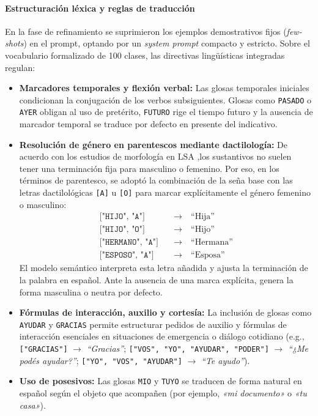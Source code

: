 \paragraph{Estructuración léxica y reglas de traducción}
En la fase de refinamiento se suprimieron los ejemplos demostrativos fijos (\textit{few-shots}) en el prompt, optando por un \textit{system prompt} compacto y estricto. Sobre el vocabulario formalizado de 100 clases, las directivas lingüísticas integradas regulan:
\begin{itemize}
    \item \textbf{Marcadores temporales y flexión verbal:} Las glosas temporales iniciales condicionan la conjugación de los verbos subsiguientes. Glosas como \texttt{PASADO} o \texttt{AYER} obligan al uso de pretérito, \texttt{FUTURO} rige el tiempo futuro y la ausencia de marcador temporal se traduce por defecto en presente del indicativo.
    \item \textbf{Resolución de género en parentescos mediante dactilología:} De acuerdo con los estudios de morfología en LSA \parencite{massone1993numero},los sustantivos no suelen tener una terminación fija para masculino o femenino. Por eso, en los términos de parentesco, se adoptó la combinación de la seña base con las letras dactilológicas \texttt{[A]} u \texttt{[O]} para marcar explícitamente el género femenino o masculino:
    \begin{align*}
        \texttt{["HIJO", "A"]} &\quad\longrightarrow\quad \text{``Hija''} \\
        \texttt{["HIJO", "O"]} &\quad\longrightarrow\quad \text{``Hijo''} \\
        \texttt{["HERMANO", "A"]} &\quad\longrightarrow\quad \text{``Hermana''} \\
        \texttt{["ESPOSO", "A"]} &\quad\longrightarrow\quad \text{``Esposa''}
    \end{align*}
    El modelo semántico interpreta esta letra añadida y ajusta la terminación de la palabra en español. Ante la ausencia de una marca explícita, genera la forma masculina o neutra por defecto.
    \item \textbf{Fórmulas de interacción, auxilio y cortesía:} La inclusión de glosas como \texttt{AYUDAR} y \texttt{GRACIAS} permite estructurar pedidos de auxilio y fórmulas de interacción esenciales en situaciones de emergencia o diálogo cotidiano (e.g., \texttt{["GRACIAS"]} $\longrightarrow$ \textit{``Gracias''}; \texttt{["VOS", "YO", "AYUDAR", "PODER"]} $\longrightarrow$ \textit{``¿Me podés ayudar?''}; \texttt{["YO", "VOS", "AYUDAR"]} $\longrightarrow$ \textit{``Te ayudo''}).    
    \item \textbf{Uso de posesivos:} Las glosas \texttt{MIO} y \texttt{TUYO} se traducen de forma natural en español según el objeto que acompañen (por ejemplo, \textit{«mi documento»} o \textit{«tu casa»}).
\end{itemize}

